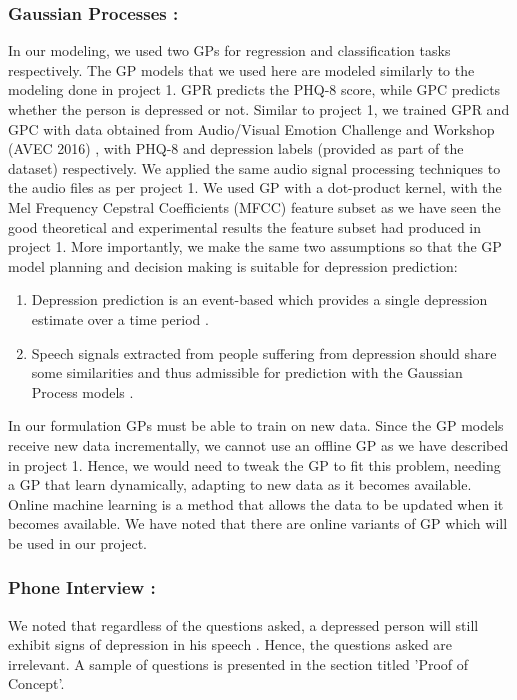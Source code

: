 \documentclass{article}
\begin{document}
    \subsubsection{Gaussian Processes :}
    In our modeling, we used two GPs for regression and classification tasks respectively. 
    The GP models that we used here are modeled similarly to the modeling done in project 1. 
    GPR predicts the PHQ-8 score, while GPC predicts whether the person is depressed or not. 
    Similar to project 1, we trained GPR and GPC with data obtained from Audio/Visual Emotion Challenge and Workshop (AVEC 2016) \cite{avec2016}, with PHQ-8 and depression labels (provided as part of the dataset) respectively. 
    We applied the same audio signal processing techniques to the audio files as per project 1. 
    We used GP with a dot-product kernel, with the Mel Frequency Cepstral Coefficients (MFCC) feature subset as we have seen the good theoretical and experimental results the feature subset had produced in project 1. 
    More importantly, we make the same two assumptions so that the GP model planning and decision making is suitable for depression prediction:
    \begin{enumerate}
        \item Depression prediction is an event-based which provides a single depression estimate over a time period \cite{Valstar2016}.
        \item Speech signals extracted from people suffering from depression should share some similarities and thus admissible for prediction with the Gaussian Process models \cite{Cummins2015}.
    \end{enumerate}
In our formulation GPs must be able to train on new data. 
    Since the GP models receive new data incrementally, we cannot use an offline GP as we have described in project 1. 
    Hence, we would need to tweak the GP to fit this problem, needing a GP that learn dynamically, adapting to new data as it becomes available. 
    Online machine learning is a method that allows the data to be updated when it becomes available. 
    We have noted that there are online variants of GP which will be used in our project.
    
    \subsubsection{Phone Interview :}
We noted that regardless of the questions asked, a depressed person will still exhibit signs of depression in his speech \cite{jad2008}. 
    Hence, the questions asked are irrelevant. 
    A sample of questions is presented in the section titled 'Proof of Concept'.
\end{document}

